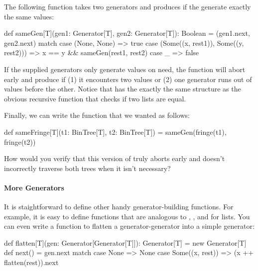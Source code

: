 The following function takes two generators and produces  if the  generate exactly the same values:
\begin{scalacode}
def sameGen[T](gen1: Generator[T], gen2: Generator[T]): Boolean = (gen1.next, gen2.next) match {
  case (None, None) => true
  case (Some((x, rest1)), Some((y, rest2))) => x == y && sameGen(rest1, rest2)
  case _ => false
}
\end{scalacode}
If the supplied generators only generate values on need, the  function will abort early and produce
 if (1) it  encounters two values  or (2) one generator runs out of values before 
the other. Notice that  has the exactly the same structure as the obvious recursive function that
checks if two lists are equal.

Finally, we can write the  function that we wanted as follows:
\begin{scalacode}
def sameFringe[T](t1: BinTree[T], t2: BinTree[T]) = sameGen(fringe(t1), fringe(t2))
\end{scalacode}

\begin{think}
How would you verify that this version of  truly aborts early and doesn't incorrectly traverse both
trees when it isn't necessary?
\end{think}

\paragraph{More Generators}

It is staightforward to define other handy generator-building functions. For example, it is easy to define functions
that are analogous to , , and  for lists. You can even write
a function to flatten a generator-generator into a simple generator:
\begin{scalacode}
def flatten[T](gen: Generator[Generator[T]]): Generator[T] = new Generator[T] {
  def next() = gen.next match {
    case None => None
    case Some((x, rest)) => (x ++ flatten(rest)).next
  }
}
\end{scalacode}



